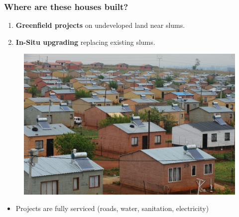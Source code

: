 \documentclass[aspectratio=149]{beamer}
\begin{document}
\begin{frame}
\frametitle{Where are these houses built?}

\begin{enumerate}
  \item \textbf{Greenfield projects} on undeveloped land near slums.
  \item \textbf{In-Situ upgrading} replacing existing slums.
\end{enumerate}

\begin{figure}
 \includegraphics[scale=.125]{figures/rdp_houses.jpg} 
\end{figure}

\begin{itemize}
  \item Projects are fully serviced (roads, water, sanitation, electricity)
\end{itemize}

\end{frame}
\end{document}
